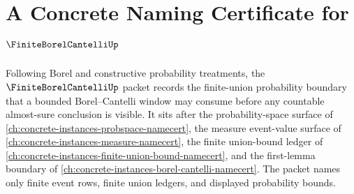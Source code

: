 \chapter{A Concrete Naming Certificate for $\FiniteBorelCantelliUp$}
\label{ch:concrete-instances-finite-borel-cantelli-namecert}

Following Borel and constructive probability treatments, the $\FiniteBorelCantelliUp$ packet records the finite-union probability boundary that a bounded Borel--Cantelli window may consume before any countable almost-sure conclusion is visible. It sits after the probability-space surface of \autoref{ch:concrete-instances-probspace-namecert}, the measure event-value surface of \autoref{ch:concrete-instances-measure-namecert}, the finite union-bound ledger of \autoref{ch:concrete-instances-finite-union-bound-namecert}, and the first-lemma boundary of \autoref{ch:concrete-instances-borel-cantelli-namecert}. The packet names only finite event rows, finite union ledgers, and displayed probability bounds.

